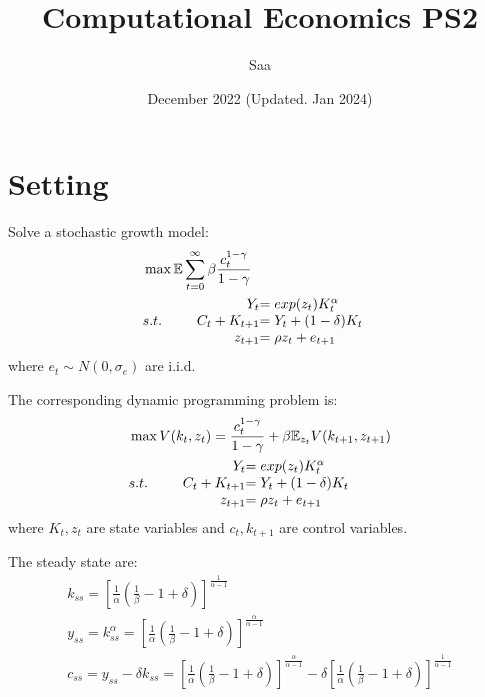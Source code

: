 \documentclass{article}
\title{Computational Economics PS2}
\author{Saa}
\date{December 2022 (Updated. Jan 2024)}
\begin{document}
	
	\maketitle
	
	\section{Setting}
	
	Solve a stochastic growth model:
	\begin{equation}
		\begin{aligned}
			&\max \mathbb{E} \sum\limits_{t=0}^\infty \beta \frac{c_t^{1-\gamma}}{1-\gamma} \\
			&s.t. \quad \begin{array}{r@{\quad}r@{}l@{\quad}l}
				&Y_t &=exp(z_t)K_t^\alpha  \\
				&C_t + K_{t+1} &=Y_t + (1-\delta)K_t\\
				&z_{t+1} &= \rho z_t +e_{t+1}
			\end{array}
		\end{aligned}
	\end{equation}
	where $e_t\sim N(0, \sigma_{e})$ are i.i.d.
	
	The corresponding dynamic programming problem is:
	\begin{equation}
		\begin{aligned}
			&\max  V(k_t, z_t) = \frac{c_t^{1-\gamma}}{1-\gamma} +\beta \mathbb{E}_{z_t} V(k_{t+1}, z_{t+1})\\
			&s.t. \quad \begin{array}{r@{\quad}r@{}l@{\quad}l}
				&Y_t &=exp(z_t)K_t^\alpha  \\
				&C_t + K_{t+1} &=Y_t + (1-\delta)K_t\\
				&z_{t+1} &= \rho z_t +e_{t+1}
			\end{array}
		\end{aligned}
	\end{equation}
	where $K_t,z_t$ are state variables and $c_t, k_{t+1}$ are control variables.
	
	The steady state are:
	\begin{gather}
		k_{ss} = [\frac{1}{\alpha}(\frac{1}{\beta} - 1 + \delta)] ^{\frac{1}{\alpha - 1}}\\
		y_{ss} = k_{ss}^\alpha =  [\frac{1}{\alpha}(\frac{1}{\beta} - 1 + \delta)] ^{\frac{\alpha}{\alpha - 1}}\\
		c_{ss} = y_{ss} - \delta k_{ss} = [\frac{1}{\alpha}(\frac{1}{\beta} - 1 + \delta)] ^{\frac{\alpha}{\alpha - 1}} - \delta [\frac{1}{\alpha}(\frac{1}{\beta} - 1 + \delta)] ^{\frac{1}{\alpha - 1}}
	\end{gather}
	
\end{document}
